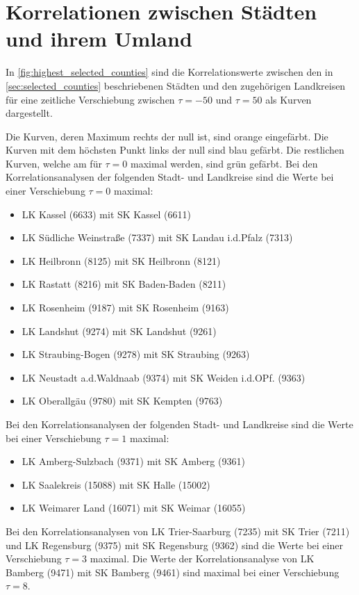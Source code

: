 \section{Korrelationen zwischen Städten und ihrem Umland}
In \autoref{fig:highest_selected_counties} sind die Korrelationswerte zwischen den in  \autoref{sec:selected_counties} beschriebenen Städten und den zugehörigen Landkreisen für eine zeitliche Verschiebung zwischen $\tau=-50$ und $\tau=50$ als Kurven dargestellt.

Die Kurven, deren Maximum rechts der null ist, sind orange eingefärbt. Die Kurven mit dem höchsten Punkt links der null sind blau gefärbt. Die restlichen Kurven, welche am für $\tau=0$ maximal werden, sind grün gefärbt.
Bei den Korrelationsanalysen der folgenden Stadt- und Landkreise sind die Werte bei einer Verschiebung $\tau=0$ maximal:
\begin{itemize}
    \item LK Kassel (6633) mit SK Kassel (6611)
    \item LK Südliche Weinstraße (7337) mit SK Landau i.d.Pfalz (7313)
    \item LK Heilbronn (8125) mit SK Heilbronn (8121)
    \item LK Rastatt (8216) mit SK Baden-Baden (8211)
    \item LK Rosenheim (9187) mit SK Rosenheim (9163)
    \item LK Landshut (9274) mit SK Landshut (9261)
    \item LK Straubing-Bogen (9278) mit SK Straubing (9263)
    \item LK Neustadt a.d.Waldnaab (9374) mit SK Weiden i.d.OPf. (9363)
    \item LK Oberallgäu (9780) mit SK Kempten (9763)
\end{itemize}
Bei den Korrelationsanalysen der folgenden Stadt- und Landkreise sind die Werte bei einer Verschiebung $\tau=1$ maximal:
\begin{itemize}
    \item LK Amberg-Sulzbach (9371) mit SK Amberg (9361)
    \item LK Saalekreis (15088) mit SK Halle (15002)
    \item LK Weimarer Land (16071) mit SK Weimar (16055)
\end{itemize}
Bei den Korrelationsanalysen von LK Trier-Saarburg (7235) mit SK Trier (7211) und LK Regensburg (9375) mit SK Regensburg (9362) sind die Werte bei einer Verschiebung $\tau=3$ maximal. Die Werte der Korrelationsanalyse von LK Bamberg (9471) mit SK Bamberg (9461) sind maximal bei einer Verschiebung $\tau=8$.
